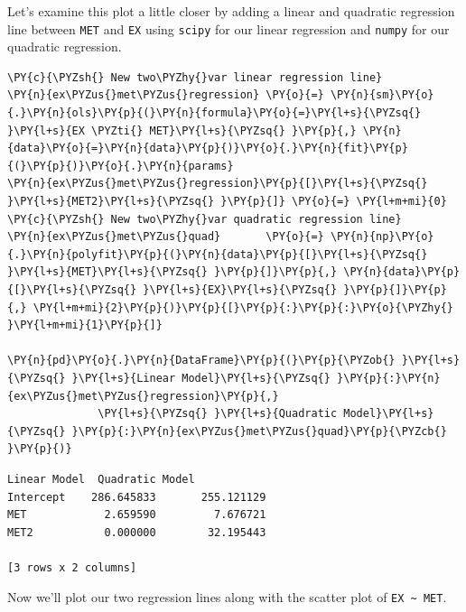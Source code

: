 \documentclass[10pt]{article}\usepackage[]{graphicx}\usepackage[]{xcolor}
\begin{document}
    Let's examine this plot a little closer by adding a linear and quadratic regression line between \texttt{MET} and
    \texttt{EX} using \texttt{scipy} for our linear regression and \texttt{numpy} for our quadratic regression.

    \begin{Verbatim}[commandchars=\\\{\}]
\PY{c}{\PYZsh{} New two\PYZhy{}var linear regression line}
\PY{n}{ex\PYZus{}met\PYZus{}regression} \PY{o}{=} \PY{n}{sm}\PY{o}{.}\PY{n}{ols}\PY{p}{(}\PY{n}{formula}\PY{o}{=}\PY{l+s}{\PYZsq{} }\PY{l+s}{EX \PYZti{} MET}\PY{l+s}{\PYZsq{} }\PY{p}{,} \PY{n}{data}\PY{o}{=}\PY{n}{data}\PY{p}{)}\PY{o}{.}\PY{n}{fit}\PY{p}{(}\PY{p}{)}\PY{o}{.}\PY{n}{params}
\PY{n}{ex\PYZus{}met\PYZus{}regression}\PY{p}{[}\PY{l+s}{\PYZsq{} }\PY{l+s}{MET2}\PY{l+s}{\PYZsq{} }\PY{p}{]} \PY{o}{=} \PY{l+m+mi}{0}
\PY{c}{\PYZsh{} New two\PYZhy{}var quadratic regression line}
\PY{n}{ex\PYZus{}met\PYZus{}quad}       \PY{o}{=} \PY{n}{np}\PY{o}{.}\PY{n}{polyfit}\PY{p}{(}\PY{n}{data}\PY{p}{[}\PY{l+s}{\PYZsq{} }\PY{l+s}{MET}\PY{l+s}{\PYZsq{} }\PY{p}{]}\PY{p}{,} \PY{n}{data}\PY{p}{[}\PY{l+s}{\PYZsq{} }\PY{l+s}{EX}\PY{l+s}{\PYZsq{} }\PY{p}{]}\PY{p}{,} \PY{l+m+mi}{2}\PY{p}{)}\PY{p}{[}\PY{p}{:}\PY{p}{:}\PY{o}{\PYZhy{} }\PY{l+m+mi}{1}\PY{p}{]}

\PY{n}{pd}\PY{o}{.}\PY{n}{DataFrame}\PY{p}{(}\PY{p}{\PYZob{} }\PY{l+s}{\PYZsq{} }\PY{l+s}{Linear Model}\PY{l+s}{\PYZsq{} }\PY{p}{:}\PY{n}{ex\PYZus{}met\PYZus{}regression}\PY{p}{,}
              \PY{l+s}{\PYZsq{} }\PY{l+s}{Quadratic Model}\PY{l+s}{\PYZsq{} }\PY{p}{:}\PY{n}{ex\PYZus{}met\PYZus{}quad}\PY{p}{\PYZcb{} }\PY{p}{)}
\end{Verbatim}

\begin{Verbatim}[commandchars=\\\{\}]
Linear Model  Quadratic Model
Intercept    286.645833       255.121129
MET            2.659590         7.676721
MET2           0.000000        32.195443

[3 rows x 2 columns]
\end{Verbatim}

    Now we'll plot our two regression lines along with the scatter plot of \texttt{EX \textasciitilde{} MET}.
\end{document}
